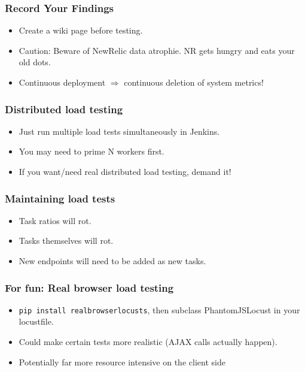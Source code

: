 \documentclass{beamer}
\begin{document}
\begin{frame}
\frametitle{Record Your Findings}
\begin{itemize}
\item Create a wiki page before testing.\pause
\item Caution: Beware of NewRelic data atrophie. NR gets hungry and eats your
      old dots.\pause
\item Continuous deployment $\Rightarrow$ continuous deletion of system metrics!
\end{itemize}
\end{frame}


\begin{frame}
\frametitle{Distributed load testing}
\begin{itemize}
\item Just run multiple load tests simultaneously in Jenkins.\pause
\item You may need to prime N workers first.\pause
\item If you want/need real distributed load testing, demand it!
\end{itemize}
\end{frame}


\begin{frame}
\frametitle{Maintaining load tests}
\begin{itemize}
\item Task ratios will rot.\pause
\item Tasks themselves will rot.\pause
\item New endpoints will need to be added as new tasks.
\end{itemize}
\end{frame}


\begin{frame}
\frametitle{For fun: Real browser load testing}
\begin{itemize}
\item \texttt{pip install realbrowserlocusts}, then subclass PhantomJSLocust in
      your locustfile.
\item Could make certain tests more realistic (AJAX calls actually happen).
\item Potentially far more resource intensive on the client side
\end{itemize}
\end{frame}
\end{document}
